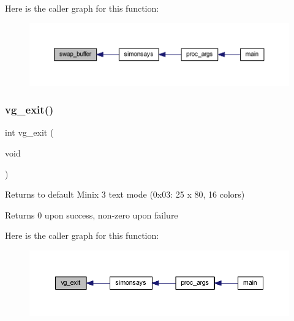 Here is the caller graph for this function\+:\nopagebreak
\begin{figure}[H]
\begin{center}
\leavevmode
\includegraphics[width=350pt]{group__video__gr_gad42c7cf5f54fed0714fcf1f6e5e35bee_icgraph}
\end{center}
\end{figure}
\mbox{\label{group__video__gr_ga42f593e6656f1a978315aff02b1bcebf}} 
\subsubsection{\texorpdfstring{vg\+\_\+exit()}{vg\_exit()}}
{\footnotesize\ttfamily int vg\+\_\+exit (\begin{DoxyParamCaption}\item[{void}]{ }\end{DoxyParamCaption})}



Returns to default Minix 3 text mode (0x03\+: 25 x 80, 16 colors) 

\begin{DoxyReturn}{Returns}
0 upon success, non-\/zero upon failure 
\end{DoxyReturn}
Here is the caller graph for this function\+:\nopagebreak
\begin{figure}[H]
\begin{center}
\leavevmode
\includegraphics[width=350pt]{group__video__gr_ga42f593e6656f1a978315aff02b1bcebf_icgraph}
\end{center}
\end{figure}
\mbox{\label{group__video__gr_gacef21667c79365d57a084bed994c2189}} 
